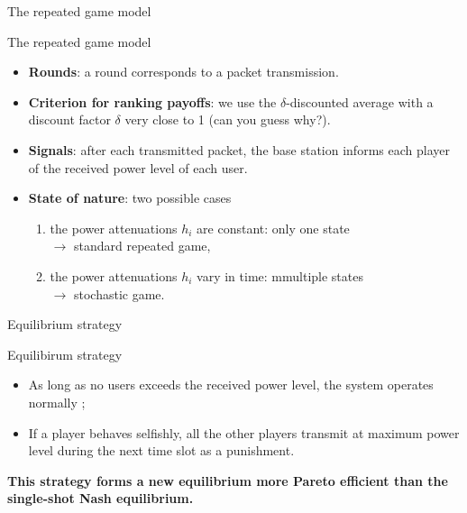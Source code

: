 \begin{frame}{The repeated game model}
    \begin{exampleblock}{The repeated game model}
        \begin{itemize}
            \pause
            \item \textbf{Rounds}: a round corresponds to a packet transmission.
            \pause
            \item \textbf{Criterion for ranking payoffs}: we use the $\delta$-discounted average with a
            discount factor $\delta$ very close to 1 (can you guess why?).
            \pause
            \item \textbf{Signals}: after each transmitted packet, the base station informs each player
            of the received power level of each user.
            \pause
            \item \textbf{State of nature}: two possible cases
            \begin{enumerate}
                \pause
                \item the power attenuations $h_i$ are constant: only one state\\
                $\to$ standard repeated game,
                \pause
                \item the power attenuations $h_i$ vary in time: mmultiple states\\
                $\to$ stochastic game.
            \end{enumerate}
        \end{itemize}
    \end{exampleblock}
\end{frame}

\begin{frame}{Equilibrium strategy}
    \begin{block}{Equilibirum strategy}
        \begin{itemize}
            \item As long as no users exceeds the received power level, the system operates normally ;
            \item If a player behaves selfishly, all the other players transmit at maximum power level
            during the next time slot as a punishment.
        \end{itemize}
    \end{block}

    \vspace{0.5cm}
    \textbf{{\color{green}This strategy forms a new equilibrium more Pareto efficient than the
    single-shot Nash equilibrium.}}
\end{frame}
